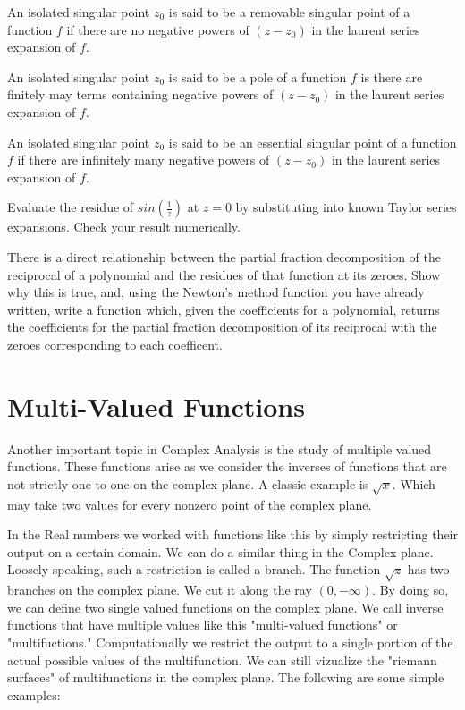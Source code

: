 An isolated singular point $z_0$ is said to be a removable singular point of a function $f$ if there are no negative powers of $(z-z_0)$ in the laurent series expansion of $f$.

An isolated singular point $z_0$ is said to be a pole of a function $f$ is there are finitely may terms containing negative powers of $(z-z_0)$ in the laurent series expansion of $f$. 

An isolated singular point $z_0$ is said to be an essential singular point of a function $f$ if there are infinitely many negative powers of $(z-z_0)$ in the laurent series expansion of $f$. 

\begin{problem}
Evaluate the residue of $sin(\frac{1}{z})$ at $z=0$ by substituting into known Taylor series expansions. Check your result numerically.
\end{problem}

\begin{problem}
There is a direct relationship between the partial fraction decomposition of the reciprocal of a polynomial and the residues of that function at its zeroes. Show why this is true, and, using the Newton's method function you have already written, write a function which, given the coefficients for a polynomial, returns the coefficients for the partial fraction decomposition of its reciprocal with the zeroes corresponding to each coefficent.
\end{problem}
 
\section*{Multi-Valued Functions}

Another important topic in Complex Analysis is the study of multiple valued functions. These functions arise as we consider the inverses of functions that are not strictly one to one on the complex plane. A classic example is $\sqrt{x}$. Which may take two values for every nonzero point of the complex plane.

In the Real numbers we worked with functions like this by simply restricting their output on a certain domain. We can do a similar thing in the Complex plane. Loosely speaking, such a restriction is called a branch. The function $\sqrt{z}$ has two branches on the complex plane. We cut it along the ray $(0,-\infty)$. By doing so, we can define two single valued functions on the complex plane. We call inverse functions that have multiple values like this "multi-valued functions" or "multifuctions." Computationally we restrict the output to a single portion of the actual possible values of the multifunction. We can still vizualize the "riemann surfaces" of multifunctions in the complex plane. The following are some simple examples:

